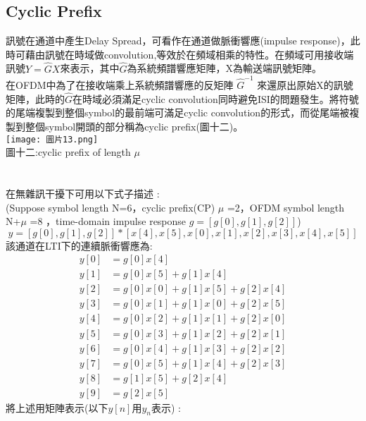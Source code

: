 \documentclass[12pt,a4paper]{article} %
\begin{document}
\subsection{Cyclic Prefix}
訊號在通道中產生Delay Spread，可看作在通道做脈衝響應(impulse response)，此時可藉由訊號在時域做convolution\cite{goldsmith2005wireless},\cite{OFDM正交分頻多工系統2}等效於在頻域相乘的特性。在頻域可用接收端訊號$Y = \hat{G}X$來表示，其中$\hat{G}$為系統頻譜響應矩陣，X為輸送端訊號矩陣。\\
在OFDM中為了在接收端乘上系統頻譜響應的反矩陣 $\hat{G}^{-1}$  來還原出原始X的訊號矩陣，此時的$\hat{G}$在時域必須滿足cyclic convolution同時避免ISI的問題發生。將符號的尾端複製到整個symbol的最前端可滿足cyclic convolution的形式，而從尾端被複製到整個symbol開頭的部分稱為cyclic prefix(圖十二)。\\
\texttt{[image: 圖片13.png]}\\
圖十二:cyclic prefix of length $\mu$ \cite{goldsmith2005wireless}\\
\\
\\
在無雜訊干擾下可用以下式子描述\cite{OFDM正交分頻多工系統2} :\\
(Suppose symbol length N=6，cyclic prefix(CP) $\mu$ =2，OFDM symbol length N+$\mu$ =8 ，time-domain impulse response $g = [g[0],g[1],g[2]]$)
\[y = [g[0], g[1], g[2]] * [x[4], x[5], x[0], x[1], x[2], x[3], x[4], x[5]]\]
該通道在LTI下的連續脈衝響應為:
\begin{align*}
y[0] &= g[0]x[4] \\
y[1] &= g[0]x[5] + g[1]x[4] \\
y[2] &= g[0]x[0] + g[1]x[5] + g[2]x[4] \\
y[3] &= g[0]x[1] + g[1]x[0] + g[2]x[5] \\
y[4] &= g[0]x[2] + g[1]x[1] + g[2]x[0] \\
y[5] &= g[0]x[3] + g[1]x[2] + g[2]x[1] \\
y[6] &= g[0]x[4] + g[1]x[3] + g[2]x[2] \\
y[7] &= g[0]x[5] + g[1]x[4] + g[2]x[3] \\
y[8] &= g[1]x[5] + g[2]x[4] \\
y[9] &= g[2]x[5]
\end{align*}
將上述用矩陣表示(以下$y[n]$用$y_n$表示) :
\end{document}
